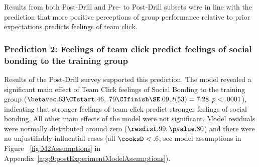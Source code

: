 Results from both Post-Drill and Pre- to Post-Drill subsets were in line with the prediction that more positive perceptions of group performance relative to prior expectations predicts feelings of team click.









\subsubsection{Prediction 2: Feelings of team click predict feelings of social bonding to the training group}

Results of the Post-Drill survey supported this prediction. The model revealed a significant main effect of Team Click feelings of Social Bonding to the training group ($\betavec .63 \CIstart .46, .79 \CIfinish \SE .09, t(53) = 7.28, p < .0001$), indicating that stronger feelings of team click predict stronger feelings of social bonding.  All other main effects of the model were not significant.  Model residuals were normally distributed around zero ($\resdist .99, \pvalue .80$) and there were no unjustifiably influential cases (all $\cooksD < .6$, see model assumptions in Figure ~\ref{fig:M2Assumptions} in Appendix~\ref{app9:postExperimentModelAssumptions}).


